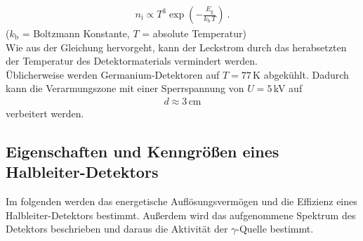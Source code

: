 \begin{align}
	n_\text{i} \propto T^3 \exp\left(-\frac{E_\text{g}}{k_\text{b}\,T} \right) \ .
\end{align}
\hfil {\footnotesize($k_\text{b}$ = Boltzmann Konstante, $T$ = absolute Temperatur)} \hfil \\
Wie aus der Gleichung hervorgeht, kann der Leckstrom durch das herabsetzten der Temperatur des Detektormaterials vermindert werden. \\
Üblicherweise werden Germanium-Detektoren auf $T = 77$\,K abgekühlt. Dadurch kann die Verarmungszone mit einer Sperrspannung von $U = 5$\,kV auf
\begin{align}
	d \approx 3\,\text{cm}
\end{align}
verbeitert werden.



\subsection{Eigenschaften und Kenngrößen eines Halbleiter-Detektors}
Im folgenden werden das energetische Auflösungsvermögen und die Effizienz eines Halbleiter-Detektors bestimmt. Außerdem wird das aufgenommene Spektrum des Detektors beschrieben und daraus die Aktivität der $\gamma$-Quelle bestimmt.



